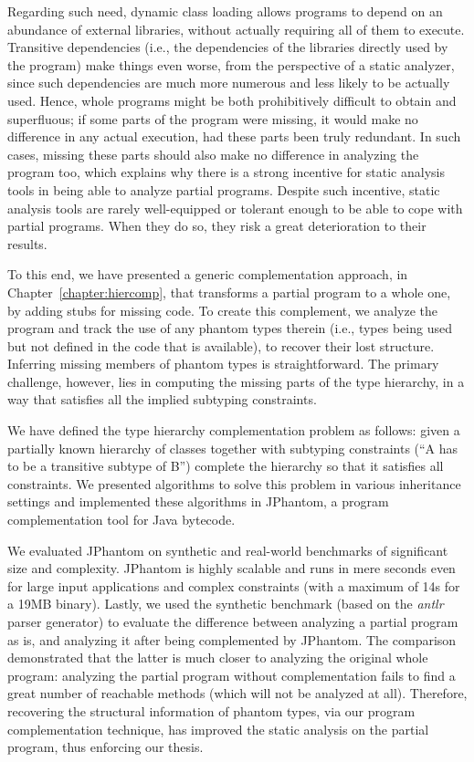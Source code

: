 Regarding such need, dynamic class loading allows programs to depend
on an abundance of external libraries, without actually requiring all
of them to execute. Transitive dependencies (i.e., the dependencies of
the libraries directly used by the program) make things even worse,
from the perspective of a static analyzer, since such dependencies are
much more numerous and less likely to be actually used. Hence, whole
programs might be both prohibitively difficult to obtain and
superfluous; if some parts of the program were missing, it would make
no difference in any actual execution, had these parts been truly
redundant. In such cases, missing these parts should also make no
difference in analyzing the program too, which explains why there is a
strong incentive for static analysis tools in being able to analyze
partial programs. Despite such incentive, static analysis tools are
rarely well-equipped or tolerant enough to be able to cope with
partial programs. When they do so, they risk a great deterioration to
their results.

To this end, we have presented a generic complementation approach, in
Chapter~\ref{chapter:hiercomp}, that transforms a partial program to a
whole one, by adding stubs for missing code. To create this
complement, we analyze the program and track the use of any phantom types
therein (i.e., types being used but not defined in the code that is
available), to recover their lost structure. Inferring missing members
of phantom types is straightforward. The primary challenge, however,
lies in computing the missing parts of the type hierarchy, in a way
that satisfies all the implied subtyping constraints.

We have defined the type hierarchy complementation problem as follows:
given a partially known hierarchy of classes together with subtyping
constraints (``A has to be a transitive subtype of B'') complete the
hierarchy so that it satisfies all constraints. We presented
algorithms to solve this problem in various inheritance settings
and  implemented these algorithms in JPhantom, a program
complementation tool for Java bytecode.

We evaluated JPhantom on synthetic and real-world benchmarks of
significant size and complexity. JPhantom is highly scalable and runs
in mere seconds even for large input applications and complex
constraints (with a maximum of 14s for a 19MB binary).
%
Lastly, we used the synthetic benchmark (based on the \emph{antlr}
parser generator) to evaluate the difference between analyzing a
partial program as is, and analyzing it after being complemented by
JPhantom. The comparison demonstrated that the latter is much closer
to analyzing the original whole program: analyzing the partial program
without complementation fails to find a great number of reachable
methods (which will not be analyzed at all). Therefore, recovering the
structural information of phantom types, via our program
complementation technique, has improved the static analysis on the
partial program, thus enforcing our thesis.

